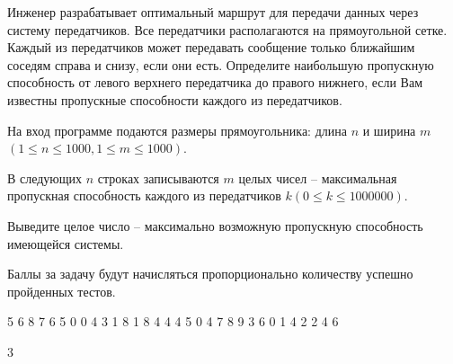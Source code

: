 
Инженер разрабатывает оптимальный маршрут для передачи данных через систему передатчиков. 
Все передатчики располагаются на прямоугольной сетке. Каждый из передатчиков может 
передавать сообщение только ближайшим соседям справа и снизу, если они есть. 
Определите наибольшую пропускную способность от левого верхнего передатчика до правого нижнего, 
если Вам известны пропускные способности каждого из передатчиков.

На вход программе подаются размеры прямоугольника: длина $n$ и ширина $m$ 
$(1\leq n\leq 1000, 1\leq m \leq 1000)$. 

В следующих $n$ строках записываются $m$ целых чисел -- максимальная пропускная способность 
каждого из передатчиков $k (0\leq k\leq 1000000)$.

\outputfmtSection
Выведите целое число -- максимально возможную пропускную способность имеющейся системы.

\markSection

Баллы за задачу будут начисляться пропорционально количеству успешно пройденных тестов.


\begin{myverbbox}[\small]{\vinput}
    5 6 
    8 7 6 5 0 0 
    4 3 1 8 1 8 
    4 4 4 5 0 4 
    7 8 9 3 6 0 
    1 4 2 2 4 6
\end{myverbbox}

\begin{myverbbox}[\small]{\voutput}
    3
\end{myverbbox}

